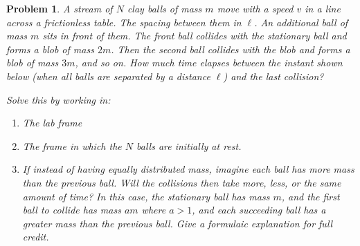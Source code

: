 \documentclass[12pt]{article}
\newcommand{\clearpts}{\addtocounter{tpts}{\value{cpts}} \setcounter{cpts}{0}}
\newcommand{\pts}[1]{\clearpts \setcounter{cpts}{#1}}
\theoremstyle{mystyle}
\newtheorem{pproblem}{Problem}
\begin{document}
\pts{10}
\begin{pproblem}
    A stream of $N$ clay balls of mass $m$ move with a speed $v$ in a line
    across a frictionless table. The spacing between them in $\ell$. An
    additional ball of mass $m$ sits in front of them. The front ball collides
    with the stationary ball and forms a blob of mass $2m$. Then the second
    ball collides with the blob and forms a blob of mass $3m$, and so on.
    How much time elapses between the instant shown below (when all balls are
    separated by a distance $\ell$) and the last collision?

    Solve this by working in:
    \begin{enumerate}[label=\Alph*)]
        \item The lab frame
        \item The frame in which the $N$ balls are initially at rest.
        \item If instead of having equally distributed mass, imagine each ball has more mass than the previous ball. Will the collisions then take more, less, or the same amount of time? In this case, the stationary ball has mass $m$, and the first ball to collide has mass $am$ where $a > 1$, and each succeeding ball has a greater mass than the previous ball. Give a formulaic explanation for full credit.
    \end{enumerate}

    \begin{figure}[H]
        \centering
    \end{figure}
\end{pproblem}
\end{document}
